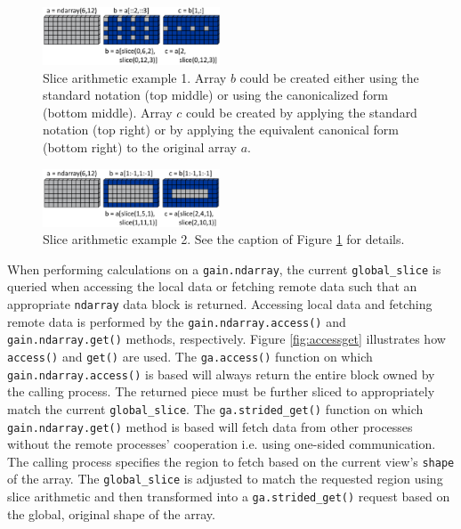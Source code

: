 \documentclass[preprint]{sigplanconf}
\begin{document}
\begin{figure}[htb]
\centering
\includegraphics[width=0.47\textwidth]{image4a_crop.eps}
\caption{
Slice arithmetic example 1. Array $b$ could be created either using the
standard notation (top middle) or using the canonicalized form (bottom
middle). Array $c$ could be created by applying the standard notation (top
right) or by applying the equivalent canonical form (bottom right) to the
original array $a$.
}
\label{fig:slice1}
\end{figure}

\begin{figure}[htb]
\centering
\includegraphics[width=0.47\textwidth]{image4b_crop.eps}
\caption{
Slice arithmetic example 2. See the caption of Figure \ref{fig:slice1} for
details.
}
\label{fig:figslice2}
\end{figure}

When performing calculations on a \verb=gain.ndarray=, the current
\verb=global_slice= is queried when accessing the local data or fetching
remote data such that an appropriate \verb=ndarray= data block is returned.
Accessing local data and fetching remote data is performed by the
\verb=gain.ndarray.access()= and \verb=gain.ndarray.get()= methods,
respectively.  Figure \ref{fig:accessget} illustrates how \verb=access()= and
\verb=get()= are used. The \verb=ga.access()= function on which\linebreak
\verb=gain.ndarray.access()= is based will always return the entire block
owned by the calling process. The returned piece must be further sliced to
appropriately match the current \verb=global_slice=. The
\verb=ga.strided_get()= function on which \verb=gain.ndarray.get()= method is
based will fetch data from other processes without the remote processes'
cooperation i.e. using one-sided communication.  The calling process specifies
the region to fetch based on the current view's \verb=shape= of the array. The
\verb=global_slice= is adjusted to match the requested region using slice
arithmetic and then transformed into a \verb=ga.strided_get()= request based
on the global, original shape of the array.
\end{document}
